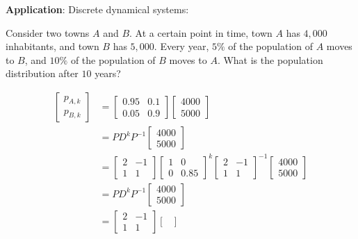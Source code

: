 \begin{paracol}{2}
\switchcolumn

\textbf{Application}: Discrete dynamical systems:

Consider two towns $A$ and $B$. At a certain point in time, town $A$ has $4,000$ inhabitants, and town $B$ has $5,000$. Every year, $5\%$ of the population of $A$ moves to $B$, and $10\%$ of the population of $B$ moves to $A$. What is the population distribution after $10$ years?

\begin{align*}
    \begin{bmatrix}
        p_{A, k} \\ p_{B, k}
    \end{bmatrix} & = \begin{bmatrix}
        0.95 & 0.1 \\
        0.05 & 0.9
    \end{bmatrix} \begin{bmatrix}
        4000 \\ 5000
    \end{bmatrix} \\
    & = P D^k P^{-1} \begin{bmatrix}
        4000 \\ 5000
    \end{bmatrix} \\
    & = \begin{bmatrix}
        2 & -1 \\
        1 & 1
    \end{bmatrix} \begin{bmatrix}
        1 & 0 \\
        0 & 0.85
    \end{bmatrix}^k \begin{bmatrix}
        2 & -1 \\
        1 & 1
    \end{bmatrix}^{-1} \begin{bmatrix}
        4000 \\ 5000
    \end{bmatrix} \\
    & = P D^k P^{-1} \begin{bmatrix}
        4000 \\ 5000
    \end{bmatrix} \\
    & = \begin{bmatrix}
        2 & -1 \\
        1 & 1
    \end{bmatrix} \begin{bmatrix}

\end{bmatrix}
\end{align*}
\end{paracol}
